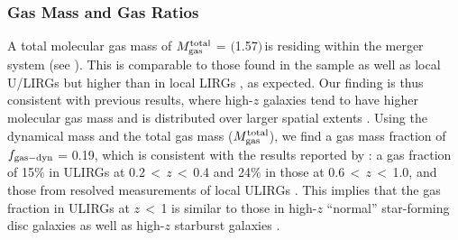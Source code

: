 \documentclass[]{emulateapj}
\begin{document}
\subsubsection{Gas Mass and Gas Ratios}
A total molecular gas mass of
$M_{\rm gas}^{\rm total}$ = $($1.57$)$\,\Msun is
residing within the merger system (see ).
This is comparable to those found in the
 sample %
as well as local U/LIRGs
\citep[][]{Sanders96a} but higher than
in local LIRGs , as expected.
Our finding is thus consistent with previous results, where
high-$z$ galaxies tend to have higher molecular gas mass %
and is
distributed over larger spatial extents
.
Using the dynamical mass and the total
gas mass ($M_{\rm gas}^{\rm total}$), we find a gas mass
fraction of $f_{\rm gas-dyn}$ = 0.19, which is
consistent with the results reported by :
a gas fraction of 15\% in ULIRGs at 0.2\,$<$\,$z$\,$<$\,0.4 and 24\%
in those at 0.6\,$<$\,$z$\,$<$\,1.0, and those from resolved measurements of local ULIRGs .
This implies that the gas fraction in ULIRGs at $z$\,$<$\,1 is
similar to those in high-$z$ ``normal'' star-forming disc galaxies
\citep[assuming an \alphaco conversion factor of 0.8 \alphaU;][]{Daddi10a,Tacconi10a} as well as
high-$z$ starburst galaxies
\citep[with similar CO sizes between the two populations (see ); cf. smaller CO sizes from earlier studies; ]{Bothwell13a}.
\end{document}
